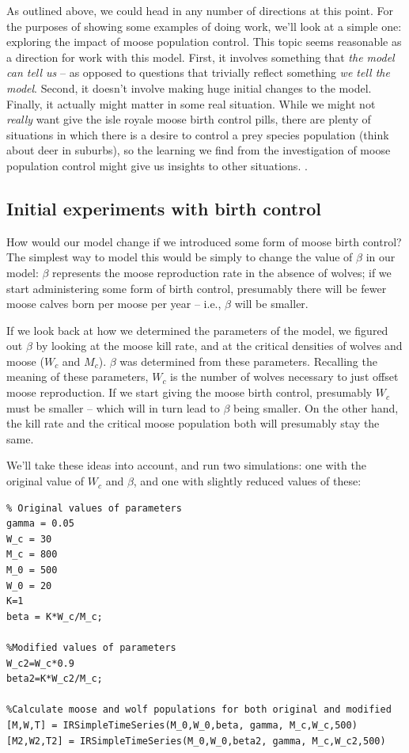 \documentclass{tufte-handout}
\begin{document}
As outlined above, we could head in any number of directions at this point.  For the purposes of showing some examples of doing work, we'll look at a simple one: exploring the impact of moose population control.
This topic seems reasonable as a direction for work with this model.  First, it  involves something that {\it the model can tell us} -- as opposed to questions that trivially reflect something {\it we tell the model}.  Second, it doesn't involve making huge initial changes to the model.  Finally, it actually might matter in some real situation.  While we might not {\it really} want give the isle royale moose birth control pills, there are plenty of situations in which there is a desire to control a prey species population (think about deer in suburbs), so the learning we find from the investigation of moose population control might give us insights to other situations.  .

\subsection{Initial experiments with birth control}

How would our model change if we introduced some form of moose birth control?  The simplest way to model this would be simply to change the value of $\beta$ in our model:  $\beta$ represents the moose reproduction rate in the absence of wolves; if we start administering some form of birth control, presumably there will be fewer moose calves born per moose per year -- i.e., $\beta$ will be smaller.

If we look back at how we determined the parameters of the model, we figured out $\beta$ by looking at the moose kill rate, and at the critical densities of wolves and moose ($W_c$ and $M_c$).  $\beta$ was determined from these parameters.  Recalling the meaning of these parameters, $W_c$ is the number of wolves necessary to just offset moose reproduction.  If we start giving the moose birth control, presumably $W_c$ must be smaller -- which will in turn lead to $\beta$ being smaller.  On the other hand, the kill rate and the critical moose population both will presumably stay the same.

We'll take these ideas into account, and run two simulations:  one with the original value of $W_c$ and $\beta$, and one with slightly reduced values of these:

\begin{verbatim}
% Original values of parameters
gamma = 0.05
W_c = 30
M_c = 800
M_0 = 500
W_0 = 20
K=1
beta = K*W_c/M_c;

%Modified values of parameters
W_c2=W_c*0.9
beta2=K*W_c2/M_c;

%Calculate moose and wolf populations for both original and modified
[M,W,T] = IRSimpleTimeSeries(M_0,W_0,beta, gamma, M_c,W_c,500)
[M2,W2,T2] = IRSimpleTimeSeries(M_0,W_0,beta2, gamma, M_c,W_c2,500)
\end{verbatim}
\end{document}
